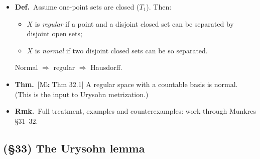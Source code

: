 \documentclass[12pt,a4paper]{article}
\newcommand{\Dfn}{\textbf{Def.}~}
\newcommand{\Thm}{\textbf{Thm.}~}
\newcommand{\Rmk}{\textbf{Rmk.}~}
\newcommand{\Mk}[1]{{\footnotesize\textcolor{cue}{[Mk #1]}}}  %
\newenvironment{BL}%
  {\begin{itemize}[leftmargin=1.4em,labelsep=0.55em,itemsep=11pt,topsep=11pt,parsep=0pt]}%
  {\end{itemize}}
\newenvironment{SB}%
  {\begin{itemize}[label=--,leftmargin=1.3em,labelsep=0.45em,itemsep=6pt,topsep=7pt,parsep=0pt]}%
  {\end{itemize}}
\newcommand{\imp}{\Rightarrow}
\begin{document}
\begin{BL}
\item \Dfn Assume one-point sets are closed ($T_1$). Then:
  \begin{SB}
  \item $X$ is \emph{regular} if a point and a disjoint closed set can be separated by
        disjoint open sets;
  \item $X$ is \emph{normal} if two disjoint closed sets can be so separated.
  \end{SB}
  Normal $\imp$ regular $\imp$ Hausdorff.
\item \Thm \Mk{Thm 32.1} A regular space with a countable basis is normal.
      (This is the input to Urysohn metrization.)
\item \Rmk Full treatment, examples and counterexamples: work through Munkres \S31--32.
\end{BL}

\subsection{(\S33) The Urysohn lemma}
\end{document}
